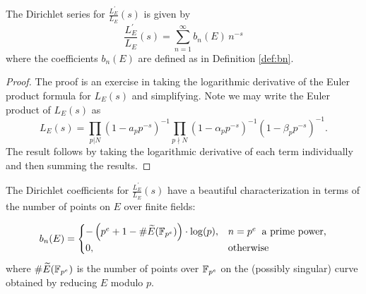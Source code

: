 \documentclass[10pt]{article}
\newcommand{\pr}{^{\prime}}
\newcommand{\Les}{L_E(s)}
\newcommand{\ldLes}{\frac{L_E\pr}{L_E}(s)}
\begin{document}
\begin{lemma}
The Dirichlet series for $\ldLes$ is given by
\begin{equation}
\ldLes = \sum_{n=1}^{\infty} b_n(E)\, n^{-s}
\end{equation}
where the coefficients $b_n(E)$ are defined as in Definition \ref{def:bn}. \\
\end{lemma}
\begin{proof}
The proof is an exercise in taking the logarithmic derivative of the Euler product formula for $\Les$ and simplifying. Note we may write the Euler product of $\Les$ as
\begin{equation}
\Les = \prod_{p|N} \left(1-a_p p^{-s}\right)^{-1} \prod_{p\nmid N} \left(1-\alpha_p p^{-s}\right)^{-1}\left(1-\beta_p p^{-s}\right)^{-1}.
\end{equation}
The result follows by taking the logarithmic derivative of each term individually and then summing the results.
\end{proof}

The Dirichlet coefficients for $\ldLes$ have a beautiful characterization in terms of the number of points on $E$ over finite fields:
\begin{theorem}[S.]
\begin{equation}
b_n(E) = \begin{cases}
-\left(p^e + 1 - \#\widetilde{E}(\mathbb{F}_{p^e})\right)\cdot \log(p), & n=p^e\;\;\text{a prime power,} \\
0, & \text{otherwise} \end{cases}
\end{equation}
where $\#\widetilde{E}(\mathbb{F}_{p^e})$ is the number of points over $\mathbb{F}_{p^e}$ on the (possibly singular) curve obtained by reducing $E$ modulo $p$.
\end{theorem}
\end{document}
